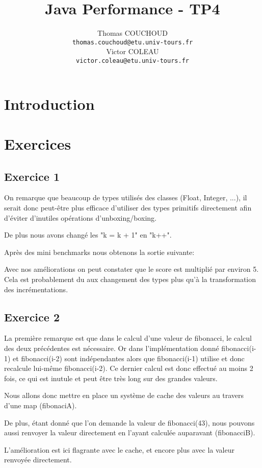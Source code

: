 \documentclass{report}
\title{Java Performance - TP4}
\author{Thomas COUCHOUD\\\texttt{thomas.couchoud@etu.univ-tours.fr}\\Victor COLEAU\\\texttt{victor.coleau@etu.univ-tours.fr}}
\begin{document}
	\mccTitle
	
	\chapter{Introduction}
	
	\chapter{Exercices}
	\section{Exercice 1}
		On remarque que beaucoup de types utilisés des classes (Float, Integer, ...), il serait donc peut-être plus efficace d'utiliser des types primitifs directement afin d'éviter d'inutiles opérations d'unboxing/boxing.
		
		De plus nous avons changé les "k = k + 1" en "k++".
		
		Après des mini benchmarks nous obtenons la sortie suivante:
		
		
		Avec nos améliorations on peut constater que le score est multiplié par environ 5.
		Cela est probablement du aux changement des types plus qu'à la transformation des incrémentations.

	\section{Exercice 2}
		La première remarque est que dans le calcul d'une valeur de fibonacci, le calcul des deux précédentes est nécessaire.
		Or dans l'implémentation donné fibonacci(i-1) et fibonacci(i-2) sont indépendantes alors que fibonacci(i-1) utilise et donc recalcule lui-même fibonacci(i-2).
		Ce dernier calcul est donc effectué au moins 2 fois, ce qui est inutule et peut être très long sur des grandes valeurs.
		
		Nous allons donc mettre en place un système de cache des valeurs au travers d'une map (fibonaciA).
		
		De plus, étant donné que l'on demande la valeur de fibonacci(43), nous pouvons aussi renvoyer la valeur directement en l'ayant calculée auparavant (fibonacciB).
		
		
		
		L'amélioration est ici flagrante avec le cache, et encore plus avec la valeur renvoyée directement.
		
\end{document}
